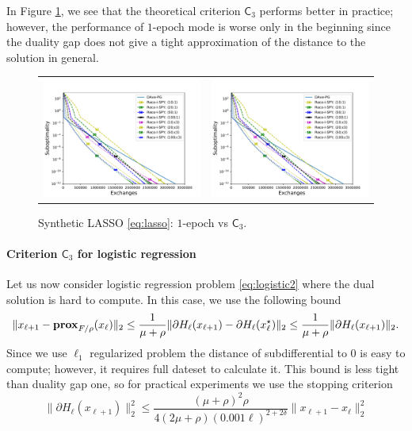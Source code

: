 In Figure \ref{fig:c3}, we see that the theoretical criterion $\mathsf{C}_3$ performs better in practice; however, the performance of $1$-epoch mode is worse only in the beginning since the duality gap does not give a tight approximation of the distance to the solution in general.
\begin{figure}[h!]
\begin{tabular}{cc}
\includegraphics[width = 0.49\linewidth]{spy/figs/lasso_5w_1000_10000_fun_vs_ex_log_coordinate.pdf}&
\includegraphics[width = 0.49\linewidth]{spy/figs/lasso_5w_1000_10000_fun_vs_ex_log_coordinate.pdf}\\%
\end{tabular}
\caption{Synthetic LASSO \eqref{eq:lasso}: $1$-epoch vs $\mathsf{C}_3$.}
\label{fig:c3}
\end{figure}

\paragraph{Criterion $\mathsf{C}_3$ for logistic regression}
Let us now consider logistic regression problem \eqref{eq:logistic2} where the dual solution is hard to compute. In this case, we use the following bound
\begin{align*}
    \|x_{\ell+1} - \mathbf{prox}_{F/\rho}(x_{\ell})\|_2\leq\frac{1}{\mu + \rho}\|\partial H_{\ell}(x_{\ell+1}) - \partial H_{\ell}(x_{\ell}^\star)\|_2\leq\frac{1}{\mu+\rho}\|\partial H_{\ell}(x_{\ell+1})\|_2.
\end{align*}
Since we use $\ell_1$ regularized problem the distance of subdifferential to $0$ is easy to compute; however, it requires full dateset to calculate it. This bound is less tight than duality gap one, so for practical experiments we use the stopping criterion
\begin{equation}\label{eq:c3_practice}
   \|\partial H_{\ell}(x_{\ell+1})\|^2_2\leq \frac{(\mu + \rho)^2\rho}{4(2\mu+\rho)(0.001\ell)^{2+2\delta}}\|x_{\ell+1}-x_{\ell}\|_2^2
\end{equation}

